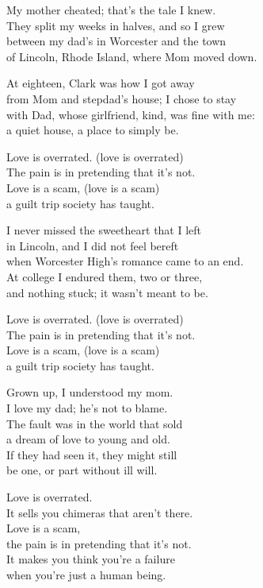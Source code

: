 \begin{lyrics}
My mother cheated; that's the tale I knew.\\
They split my weeks in halves, and so I grew\\
between my dad's in Worcester and the town\\
of Lincoln, Rhode Island, where Mom moved down.

At eighteen, Clark was how I got away\\
from Mom and stepdad's house; I chose to stay\\
with Dad, whose girlfriend, kind, was fine with me:\\
a quiet house, a place to simply be.

Love is overrated. (love is overrated)\\
The pain is in pretending that it's not.\\
Love is a scam, (love is a scam)\\
a guilt trip society has taught.

I never missed the sweetheart that I left\\
in Lincoln, and I did not feel bereft\\
when Worcester High's romance came to an end.\\
At college I endured them, two or three,\\
and nothing stuck; it wasn't meant to be.

Love is overrated. (love is overrated)\\
The pain is in pretending that it's not.\\
Love is a scam, (love is a scam)\\
a guilt trip society has taught.

Grown up, I understood my mom.\\
I love my dad; he's not to blame.\\
The fault was in the world that sold\\
a dream of love to young and old.\\
If they had seen it, they might still\\
be one, or part without ill will.

Love is overrated.\\
It sells you chimeras that aren't there.\\
Love is a scam,\\
the pain is in pretending that it's not.\\
It makes you think you're a failure\\
when you're just a human being.
\end{lyrics}

